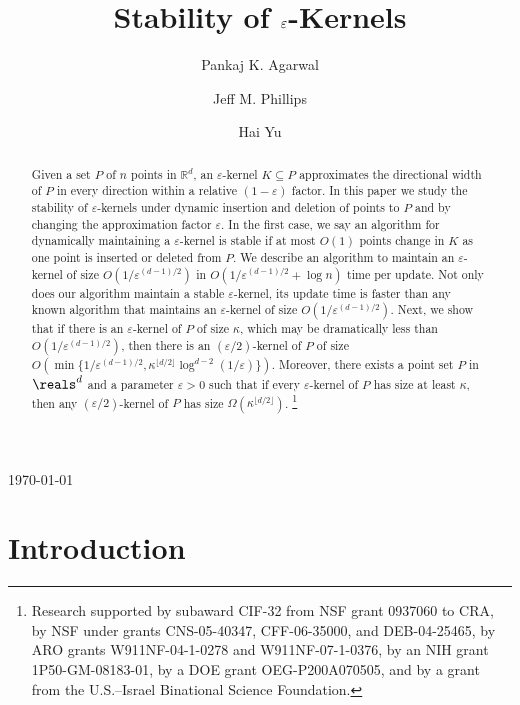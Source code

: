 \documentclass[11pt]{myclass}
\title{Stability of $\eps$-Kernels}
\author{Pankaj K. Agarwal\and 
Jeff M. Phillips\and 
Hai Yu}
\newcommand{\eps}{\varepsilon}
\renewcommand{\b}[1]{\ensuremath{\mathbb{#1}}}
\begin{document}
\begin{titlepage}
\maketitle

\begin{center} \today \end{center}

\begin{abstract}
Given a set $P$ of $n$ points in $\b{R}^d$, an $\eps$-kernel $K \subseteq P$ 
approximates the directional width of $P$ in every direction within a relative 
$(1-\eps)$ factor.  In this paper we study the stability of 
$\eps$-kernels under dynamic insertion and deletion of points to $P$ and by changing the approximation factor $\eps$.
In the first case, we say an algorithm for dynamically
maintaining a $\eps$-kernel is stable if at most $O(1)$ points
change in $K$ as one point is inserted or deleted from $P$.
We describe an algorithm to maintain an $\eps$-kernel of 
size $O(1/\eps^{(d-1)/2})$ in $O(1/\eps^{(d-1)/2} + \log n)$ 
time per update.  Not only does our algorithm maintain a
stable $\eps$-kernel, its update time is faster than any known
algorithm that maintains an $\eps$-kernel of size
$O(1/\eps^{(d-1)/2})$. 
Next, we show that if there is an $\eps$-kernel of $P$ of
size $\kappa$, which may be dramatically less than 
$O(1/\eps^{(d-1)/2})$, then there is 
an $(\eps/2)$-kernel of $P$ of size 
$O(\min\{ 1/\eps^{(d-1)/2},
	\kappa^{\lfloor d/2 \rfloor} \log^{d-2} (1/\eps)\})$.
Moreover, 
there exists a point set $P$ in $\reals^d$ and a parameter
$\eps > 0$ such that if every $\eps$-kernel of $P$ has size at
least $\kappa$, then any $(\eps/2)$-kernel of $P$ has size 
$\Omega(\kappa^{\lfloor d/2 \rfloor})$.
\footnote{Research supported by 
    subaward CIF-32 from NSF grant 0937060 to CRA, 
    by NSF under grants
    CNS-05-40347, CFF-06-35000, and DEB-04-25465, by ARO grants
    W911NF-04-1-0278 and W911NF-07-1-0376, by an NIH grant
    1P50-GM-08183-01, by a DOE grant OEG-P200A070505, and by a grant
    from the U.S.--Israel Binational Science Foundation.}
\end{abstract}
\end{titlepage}






\section{Introduction}
\label{sec:intro}
\end{document}
